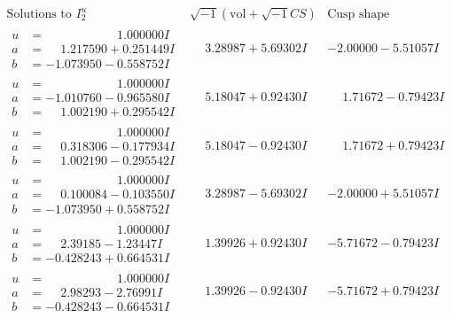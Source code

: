 \documentclass[1p]{elsarticle_modified}
\theoremstyle{definition}
\newcommand{\I}{\sqrt{-1}}
\begin{document}
$$\begin{array}{c|c|c}  
\text{Solutions to }I^u_{2}& \I (\text{vol} + \sqrt{-1}CS) & \text{Cusp shape}\\
 \hline 
\begin{aligned}
u &= \phantom{-0.000000 -}1.000000 I \\
a &= \phantom{-}1.217590 + 0.251449 I \\
b &= -1.073950 - 0.558752 I\end{aligned}
 & \phantom{-}3.28987 + 5.69302 I & -2.00000 - 5.51057 I \\ \hline\begin{aligned}
u &= \phantom{-0.000000 -}1.000000 I \\
a &= -1.010760 - 0.965580 I \\
b &= \phantom{-}1.002190 + 0.295542 I\end{aligned}
 & \phantom{-}5.18047 + 0.92430 I & \phantom{-}1.71672 - 0.79423 I \\ \hline\begin{aligned}
u &= \phantom{-0.000000 -}1.000000 I \\
a &= \phantom{-}0.318306 - 0.177934 I \\
b &= \phantom{-}1.002190 - 0.295542 I\end{aligned}
 & \phantom{-}5.18047 - 0.92430 I & \phantom{-}1.71672 + 0.79423 I \\ \hline\begin{aligned}
u &= \phantom{-0.000000 -}1.000000 I \\
a &= \phantom{-}0.100084 - 0.103550 I \\
b &= -1.073950 + 0.558752 I\end{aligned}
 & \phantom{-}3.28987 - 5.69302 I & -2.00000 + 5.51057 I \\ \hline\begin{aligned}
u &= \phantom{-0.000000 -}1.000000 I \\
a &= \phantom{-}2.39185 - 1.23447 I \\
b &= -0.428243 + 0.664531 I\end{aligned}
 & \phantom{-}1.39926 + 0.92430 I & -5.71672 - 0.79423 I \\ \hline\begin{aligned}
u &= \phantom{-0.000000 -}1.000000 I \\
a &= \phantom{-}2.98293 - 2.76991 I \\
b &= -0.428243 - 0.664531 I\end{aligned}
 & \phantom{-}1.39926 - 0.92430 I & -5.71672 + 0.79423 I \\ \hline\begin{aligned}

\end{aligned}
\end{array}$$
\end{document}
